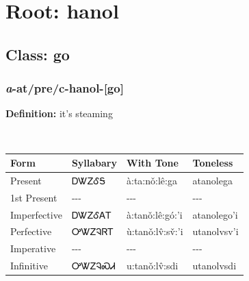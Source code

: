\needspace{4in}
\section*{Root: hanol}
\nopagebreak
{}
\needspace{3in}
\subsection*{Class: go}
\nopagebreak
\needspace{2in}
\subsubsection*{\textit{a}{-}at/pre/c{-}\textbf{hanol}{-}[go]}
\nopagebreak
\textbf{Definition: } it{\textquoteright}s steaming
\\[0.5em]
\begin{tabularx}{\textwidth}{l X X X}%
\toprule%
\textbf{Form}&\textbf{Syllabary}&\textbf{With Tone}&\textbf{Toneless}\\%
\midrule%
Present&ᎠᏔᏃᎴᎦ&à:ta:nǒ:lê:ga&atanolega\\%
1st Present&{-}{-}{-}&{-}{-}{-}&{-}{-}{-}\\%
Imperfective&ᎠᏔᏃᎴᎪᎢ&à:tanǒ:lê:gó:’i&atanolego’i\\%
Perfective&ᎤᏔᏃᎸᏒᎢ&ù:tanǒ:lv̂:sv̌:’i&utanolvsv’i\\%
Imperative&{-}{-}{-}&{-}{-}{-}&{-}{-}{-}\\%
Infinitive&ᎤᏔᏃᎸᏍᏗ&u:tanǒ:lv̂:sdi&utanolvsdi\\%
\bottomrule%
\end{tabularx}
\\[1em]